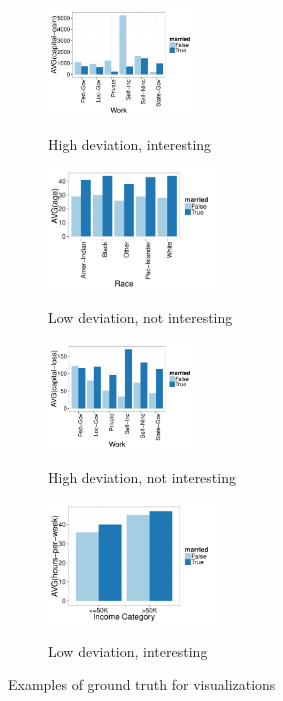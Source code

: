 \begin{figure}[t]
	\centering
	\begin{subfigure}{0.45\linewidth}
		{\includegraphics[width=4cm, trim=0 0 3cm 0, clip=true] {Images/HUHI_work_avg_cap_gain.pdf}}
		\caption{High deviation, interesting}
		\label{fig:huhi}  
	\end{subfigure}
	\begin{subfigure}{0.54\linewidth}
		{\includegraphics[width=4.5cm] {Images/LULI_race_avg_age.pdf}}
		\caption{Low deviation, not interesting}
		\label{fig:luli}
	\end{subfigure}
	\begin{subfigure}{0.45\linewidth}
		{\includegraphics[width=4cm, trim=0 0 3cm 0, clip=true] {Images/HULI_work_avg_cap_loss.pdf}}
		\caption{High deviation, not interesting}
		\label{fig:huli}  
	\end{subfigure}
	\begin{subfigure}{0.54\linewidth}
		{\includegraphics[width=4.5cm] {Images/LUHI_inc_avg_hours.pdf}}
		\caption{Low deviation, interesting}
		\label{fig:luhi}
	\end{subfigure}
	\vspace{-10pt}
	\caption{Examples of ground truth for visualizations}
	\vspace{-10pt}
	\label{fig:gt_examples}
\end{figure} 


